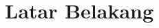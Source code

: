 \section{Latar Belakang}
\label{sec:latarbelakang}

\textcolor{red}{\lipsum[1]}

\textcolor{red}{\lipsum[3][1-16]}
